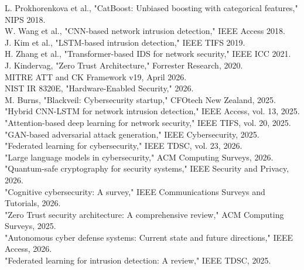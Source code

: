 \documentclass[12pt]{article}
\begin{document}
\noindent
[13] L. Prokhorenkova et al., "CatBoost: Unbiased boosting with categorical features," NIPS 2018.\\

\noindent
[14] W. Wang et al., "CNN-based network intrusion detection," IEEE Access 2018.\\

\noindent
[15] J. Kim et al., "LSTM-based intrusion detection," IEEE TIFS 2019.\\

\noindent
[16] H. Zhang et al., "Transformer-based IDS for network security," IEEE ICC 2021.\\

\noindent
[17] J. Kindervag, "Zero Trust Architecture," Forrester Research, 2020.\\

\noindent
[18] MITRE ATT and CK Framework v19, April 2026.\\

\noindent
[19] NIST IR 8320E, "Hardware-Enabled Security," 2026.\\

\noindent
[20] M. Burns, "Blackveil: Cybersecurity startup," CFOtech New Zealand, 2025.\\

\noindent
[21] "Hybrid CNN-LSTM for network intrusion detection," IEEE Access, vol. 13, 2025.\\

\noindent
[22] "Attention-based deep learning for network security," IEEE TIFS, vol. 20, 2025.\\

\noindent
[23] "GAN-based adversarial attack generation," IEEE Cybersecurity, 2025.\\

\noindent
[24] "Federated learning for cybersecurity," IEEE TDSC, vol. 23, 2026.\\

\noindent
[25] "Large language models in cybersecurity," ACM Computing Surveys, 2026.\\

\noindent
[26] "Quantum-safe cryptography for security systems," IEEE Security and Privacy, 2026.\\

\noindent
[27] "Cognitive cybersecurity: A survey," IEEE Communications Surveys and Tutorials, 2026.\\

\noindent
[28] "Zero Trust security architecture: A comprehensive review," ACM Computing Surveys, 2025.\\

\noindent
[29] "Autonomous cyber defense systems: Current state and future directions," IEEE Access, 2026.\\

\noindent
[30] "Federated learning for intrusion detection: A review," IEEE TDSC, 2025.
\end{document}

